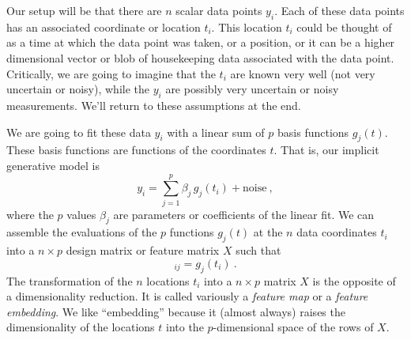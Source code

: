 \documentclass[12pt,letterpaper]{article}
\begin{document}
Our setup will be that there are $n$ scalar data points $y_i$.
Each of these data points has an associated coordinate or location $t_i$.
This location $t_i$ could be thought of as a time at which the data point was taken, or a position, or it can be a higher dimensional vector or blob of housekeeping data associated with the data point.
Critically, we are going to imagine that the $t_i$ are known very well (not very uncertain or noisy), while the $y_i$ are possibly very uncertain or noisy measurements.
We'll return to these assumptions at the end.

We are going to fit these data $y_i$ with a linear sum of $p$ basis functions $g_j(t)$. These basis functions are functions of the coordinates $t$. That is, our implicit generative model is
\begin{equation}
    y_i = \sum_{j=1}^p \beta_j\,g_j(t_i) + \mathrm{noise}
    ~,
\label{eq.model}
\end{equation}
where the $p$ values $\beta_j$ are parameters or coefficients of the linear fit. We can assemble the evaluations of the $p$ functions $g_j(t)$ at the $n$ data coordinates $t_i$ into a $n\times p$ design matrix or feature matrix $X$ such that
\begin{equation}
    [X]_{ij} = g_j(t_i)
    ~.
\end{equation}
The transformation of the $n$ locations $t_i$ into a $n\times p$ matrix $X$ is the opposite of a dimensionality reduction.
It is called variously a \emph{feature map} or a \emph{feature embedding}.
We like ``embedding'' because it (almost always) raises the dimensionality of the locations $t$ into the $p$-dimensional space of the rows of $X$.
\end{document}
